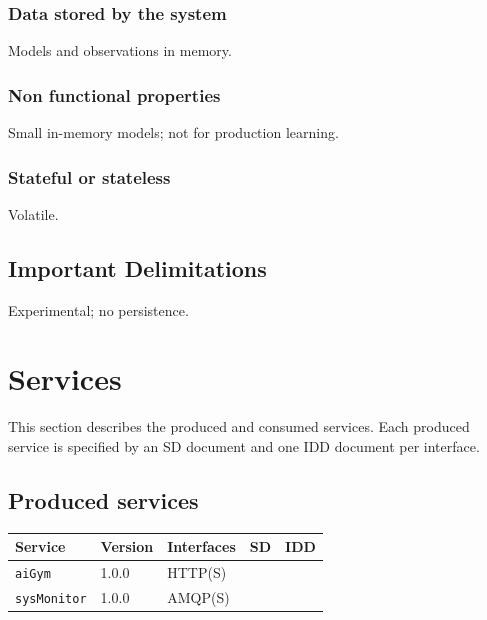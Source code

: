 \documentclass[a4paper]{arrowhead}
\begin{document}
\subsubsection{Data stored by the system}

Models and observations in memory.

\subsubsection{Non functional properties}

Small in-memory models; not for production learning.

\subsubsection{Stateful or stateless}

Volatile.

\subsection{Important Delimitations}
\label{sec:delimitations}

Experimental; no persistence.

\newpage

\section{Services}
\label{sec:services}

This section describes the produced and consumed services. Each produced service is specified by an SD document and one IDD document per interface.

\subsection{Produced services}

\noindent\begin{longtable}{| p{5.3cm} | p{1.3cm} | p{2.6cm} | p{1.6cm} | p{3.6cm} |} \hline
\rowcolor{gray!33} Service & Version & Interfaces & SD & IDD \\ \hline \endhead
\texttt{aiGym} & 1.0.0 & HTTP(S) & \cite{aig-aiGym-sd} & \cite{aig-aiGym-http-idd} \\ \hline
\texttt{sysMonitor} & 1.0.0 & AMQP(S) & \cite{aig-sysMonitor-sd} & \cite{aig-sysMonitor-amqp-idd} \\ \hline
\end{longtable}
\end{document}
